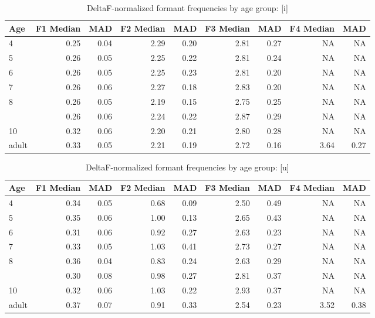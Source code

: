\documentclass[
]{article}
\begin{document}
\begin{table}[!h]

\caption{\label{tab:deltaf-measurement-table-i}DeltaF-normalized formant frequencies by age group: [i]}
\centering
\begin{tabular}[t]{lrrrrrrrr}
\toprule
Age & F1 Median & MAD & F2 Median & MAD & F3 Median & MAD & F4 Median & MAD\\
\midrule
4 & 0.25 & 0.04 & 2.29 & 0.20 & 2.81 & 0.27 & NA & NA\\
5 & 0.26 & 0.05 & 2.25 & 0.22 & 2.81 & 0.24 & NA & NA\\
6 & 0.26 & 0.05 & 2.25 & 0.23 & 2.81 & 0.20 & NA & NA\\
7 & 0.26 & 0.06 & 2.27 & 0.18 & 2.83 & 0.20 & NA & NA\\
8 & 0.26 & 0.05 & 2.19 & 0.15 & 2.75 & 0.25 & NA & NA\\
\addlinespace
9 & 0.26 & 0.06 & 2.24 & 0.22 & 2.87 & 0.29 & NA & NA\\
10 & 0.32 & 0.06 & 2.20 & 0.21 & 2.80 & 0.28 & NA & NA\\
adult & 0.33 & 0.05 & 2.21 & 0.19 & 2.72 & 0.16 & 3.64 & 0.27\\
\bottomrule
\end{tabular}
\end{table}

\begin{table}[!h]

\caption{\label{tab:deltaf-measurement-table-u}DeltaF-normalized formant frequencies by age group: [u]}
\centering
\begin{tabular}[t]{lrrrrrrrr}
\toprule
Age & F1 Median & MAD & F2 Median & MAD & F3 Median & MAD & F4 Median & MAD\\
\midrule
4 & 0.34 & 0.05 & 0.68 & 0.09 & 2.50 & 0.49 & NA & NA\\
5 & 0.35 & 0.06 & 1.00 & 0.13 & 2.65 & 0.43 & NA & NA\\
6 & 0.31 & 0.06 & 0.92 & 0.27 & 2.63 & 0.23 & NA & NA\\
7 & 0.33 & 0.05 & 1.03 & 0.41 & 2.73 & 0.27 & NA & NA\\
8 & 0.36 & 0.04 & 0.83 & 0.24 & 2.63 & 0.29 & NA & NA\\
\addlinespace
9 & 0.30 & 0.08 & 0.98 & 0.27 & 2.81 & 0.37 & NA & NA\\
10 & 0.32 & 0.06 & 1.03 & 0.22 & 2.93 & 0.37 & NA & NA\\
adult & 0.37 & 0.07 & 0.91 & 0.33 & 2.54 & 0.23 & 3.52 & 0.38\\
\bottomrule
\end{tabular}
\end{table}
\end{document}
